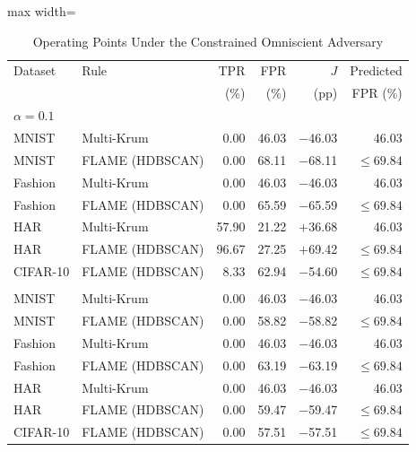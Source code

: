 \begin{table}[!t]
\centering\footnotesize
\setlength{\tabcolsep}{4pt}
\caption{Operating Points Under the Constrained Omniscient Adversary}\label{tab:constrained}
\begin{adjustbox}{max width=\columnwidth}
\begin{tabular}{llrrrr}
\toprule
Dataset & Rule & TPR & FPR & $J$ & Predicted \\
 &  & (\%) & (\%) & (pp) & FPR (\%) \\
\midrule
\multicolumn{6}{l}{\emph{$\alpha=0.1$}} \\
\quad MNIST & Multi-Krum & 0.00 & 46.03 & $-$46.03 & 46.03 \\
\quad MNIST & FLAME (HDBSCAN) & 0.00 & 68.11 & $-$68.11 & $\leq69.84$ \\
\quad Fashion & Multi-Krum & 0.00 & 46.03 & $-$46.03 & 46.03 \\
\quad Fashion & FLAME (HDBSCAN) & 0.00 & 65.59 & $-$65.59 & $\leq69.84$ \\
\quad HAR & Multi-Krum & 57.90 & 21.22 & $+$36.68 & 46.03 \\
\quad HAR & FLAME (HDBSCAN) & 96.67 & 27.25 & $+$69.42 & $\leq69.84$ \\
\quad CIFAR-10 & FLAME (HDBSCAN) & 8.33 & 62.94 & $-$54.60 & $\leq69.84$ \\
\addlinespace[3pt]
\multicolumn{6}{l}{\emph{$\alpha=0.01$}} \\
\quad MNIST & Multi-Krum & 0.00 & 46.03 & $-$46.03 & 46.03 \\
\quad MNIST & FLAME (HDBSCAN) & 0.00 & 58.82 & $-$58.82 & $\leq69.84$ \\
\quad Fashion & Multi-Krum & 0.00 & 46.03 & $-$46.03 & 46.03 \\
\quad Fashion & FLAME (HDBSCAN) & 0.00 & 63.19 & $-$63.19 & $\leq69.84$ \\
\quad HAR & Multi-Krum & 0.00 & 46.03 & $-$46.03 & 46.03 \\
\quad HAR & FLAME (HDBSCAN) & 0.00 & 59.47 & $-$59.47 & $\leq69.84$ \\
\quad CIFAR-10 & FLAME (HDBSCAN) & 0.00 & 57.51 & $-$57.51 & $\leq69.84$ \\
\bottomrule
\end{tabular}
\end{adjustbox}


\end{table}
